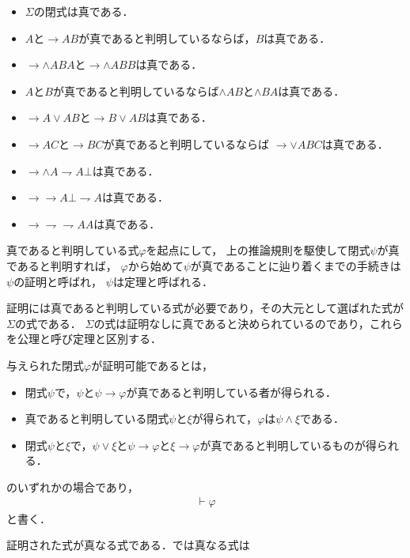 \documentclass[a4j,10.5pt,oneside,openany]{jsbook}
\begin{document}
	\begin{itemize}
		\item $\Sigma$の閉式は真である．
		\item $A$と$\rightarrow AB$が真であると判明しているならば，$B$は真である．
		\item $\rightarrow \wedge ABA$と$\rightarrow \wedge ABB$は真である．
		\item $A$と$B$が真であると判明しているならば$\wedge AB$と$\wedge BA$は真である．
		\item $\rightarrow A\vee AB$と$\rightarrow B \vee AB$は真である．
		\item $\rightarrow AC$と$\rightarrow BC$が真であると判明しているならば
			$\rightarrow \vee ABC$は真である．
		\item $\rightarrow\wedge A \rightharpoondown A \bot$は真である．
		\item $\rightarrow \rightarrow A \bot \rightharpoondown A$は真である．
		\item $\rightarrow \rightharpoondown\rightharpoondown AA$は真である．
	\end{itemize}
	
	真であると判明している式$\varphi$を起点にして，
	上の推論規則を駆使して閉式$\psi$が真であると判明すれば，
	$\varphi$から始めて$\psi$が真であることに辿り着くまでの手続きは$\psi$の証明と呼ばれ，
	$\psi$は定理と呼ばれる．
	
	証明には真であると判明している式が必要であり，その大元として選ばれた式が$\Sigma$の式である．
	$\Sigma$の式は証明なしに真であると決められているのであり，これらを公理と呼び定理と区別する．
	
	与えられた閉式$\varphi$が証明可能であるとは，
	\begin{itemize}
		\item 閉式$\psi$で，$\psi$と$\psi \rightarrow \varphi$が真であると判明している者が得られる．
		\item 真であると判明している閉式$\psi$と$\xi$が得られて，$\varphi$は$\psi \wedge \xi$である．
		\item 閉式$\psi$と$\xi$で，$\psi \vee \xi$と$\psi \rightarrow \varphi$と$\xi \rightarrow \varphi$が真であると判明しているものが得られる．
	\end{itemize}
	
	のいずれかの場合であり，
	\begin{align}
		\vdash \varphi
	\end{align}
	と書く．
	
	証明された式が真なる式である．では真なる式は
\end{document}
